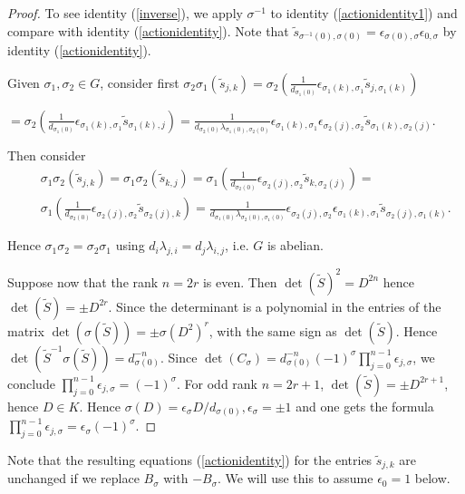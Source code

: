 \documentclass[12pt,psamsfonts]{amsart}
\newcommand{\e}{{\epsilon}}
\newcommand{\ts}{\tilde{s}}
\numberwithin{equation}{section}
\theoremstyle{definition}
\begin{document}
\begin{proof}
To see identity (\ref{inverse}), we apply $\sigma^{-1}$ to identity
(\ref{actionidentity1}) and compare with identity
(\ref{actionidentity}). Note that
$\ts_{\sigma^{-1}(0),\sigma(0)}=\e_{\sigma(0),\sigma}\e_{0,\sigma}$
by identity (\ref{actionidentity}).

Given $\sigma_1, \sigma_2 \in G$, consider first $\sigma_2\sigma_1
(\tilde{s}_{j,k})=\sigma_2(\frac{1}{d_{\sigma_1(0)}}\e_{\sigma_1(k),\sigma_1}\tilde{s}_{j,\sigma_1(k)})$

$=\sigma_2(\frac{1}{d_{\sigma_1(0)}}\e_{\sigma_1(k),\sigma_1}\tilde{s}_{\sigma_1(k),j})$$=
\frac{1}{d_{\sigma_2(0)}\lambda_{\sigma_1(0),\sigma_2(0)}}\e_{\sigma_1(k),\sigma_1}\e_{\sigma_2(j),
\sigma_2}\tilde{s}_{\sigma_1(k),\sigma_2(j)}$.

Then consider
\begin{eqnarray*} &&\sigma_1\sigma_2 (\tilde{s}_{j,k})=\sigma_1\sigma_2
(\tilde{s}_{k,j})=
\sigma_1(\frac{1}{d_{\sigma_2(0)}}\e_{\sigma_2(j),\sigma_2}\tilde{s}_{k,\sigma_2(j)})
=\\
&&\sigma_1(\frac{1}{d_{\sigma_2(0)}}\e_{\sigma_2(j),\sigma_2}\tilde{s}_{\sigma_2(j),k})
=\frac{1}{d_{\sigma_1(0)}\lambda_{\sigma_2(0),\sigma_1(0)}}\e_{\sigma_2(j),\sigma_2}\e_{\sigma_1(k),
\sigma_1}\tilde{s}_{\sigma_2(j),\sigma_1(k)}.
\end{eqnarray*}

Hence $\sigma_1\sigma_2=\sigma_2\sigma_1$ using
$d_i\lambda_{j,i}=d_j\lambda_{i,j}$, i.e. $G$ is abelian.


Suppose now that the rank $n=2r$ is even. Then $\det(\tilde S)^2 =
D^{2n}$ hence $\det(\tilde S)=\pm D^{2r}$. Since the determinant
is a polynomial in the entries of the matrix $\det(\sigma(\tilde
S))=\pm \sigma(D^2)^r$, with the same sign as $\det(\tilde S)$.
Hence $\det(\tilde S^{-1} \sigma(\tilde S))=d_{\sigma(0)}^{-n}$.
Since $\det(C_{\sigma})=d_{\sigma(0)}^{-n} (-1)^{\sigma}
\prod_{j=0}^{n-1} \e_{j,\sigma}$, we conclude $\prod_{j=0}^{n-1}
\e_{j,\sigma}=(-1)^{\sigma}$. For odd rank $n=2r+1$, $\det(\tilde
S)=\pm D^{2r+1}$, hence $D\in K$. Hence $\sigma(D)=\e_{\sigma}
D/d_{\sigma(0)}, \e_{\sigma}=\pm 1$ and one gets the formula
$\prod_{j=0}^{n-1} \e_{j,\sigma}=\e_{\sigma} (-1)^{\sigma}$.

\end{proof}

Note that the resulting equations (\ref{actionidentity}) for the
entries $\tilde s_{j,k}$ are unchanged if we replace $B_{\sigma}$
with $-B_{\sigma}$. We will use this to assume $\e_0=1$ below.
\end{document}

